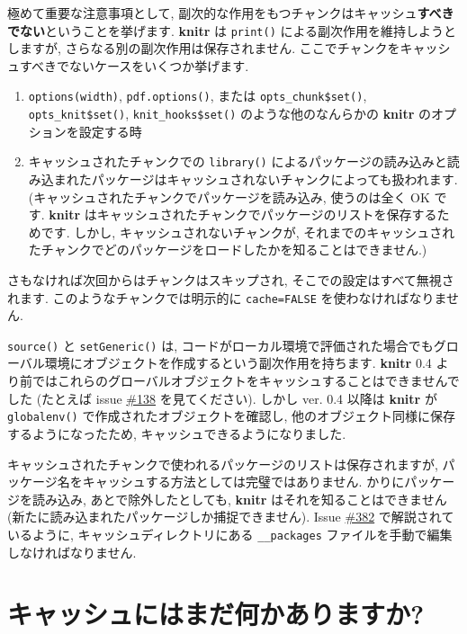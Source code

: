 \documentclass[
  xelatex,ja=standard,jafont=noto]{bxjsreport}
\providecommand{\tightlist}{%
  \setlength{\itemsep}{0pt}\setlength{\parskip}{0pt}}
\begin{document}
極めて重要な注意事項として,
副次的な作用をもつチャンクはキャッシュ\textbf{すべきでない}ということを挙げます.
\textbf{knitr} は \texttt{print()} による副次作用を維持しようとしますが,
さらなる別の副次作用は保存されません.
ここでチャンクをキャッシュすべきでないケースをいくつか挙げます.

\begin{enumerate}
\def\labelenumi{\arabic{enumi}.}
\tightlist
\item
  \texttt{options(\textquotesingle{}width\textquotesingle{})},
  \texttt{pdf.options()}, または \texttt{opts\_chunk\$set()},
  \texttt{opts\_knit\$set()}, \texttt{knit\_hooks\$set()}
  のような他のなんらかの \textbf{knitr} のオプションを設定する時
\item
  キャッシュされたチャンクでの \texttt{library()}
  によるパッケージの読み込みと読み込まれたパッケージはキャッシュされないチャンクによっても扱われます.
  (キャッシュされたチャンクでパッケージを読み込み, 使うのは全く OK です.
  \textbf{knitr}
  はキャッシュされたチャンクでパッケージのリストを保存するためです.
  しかし, キャッシュされないチャンクが,
  それまでのキャッシュされたチャンクでどのパッケージをロードしたかを知ることはできません.)
\end{enumerate}

さもなければ次回からはチャンクはスキップされ,
そこでの設定はすべて無視されます. このようなチャンクでは明示的に
\texttt{cache=FALSE} を使わなければなりません.

\texttt{source()} と \texttt{setGeneric()} は,
コードがローカル環境で評価された場合でもグローバル環境にオブジェクトを作成するという副次作用を持ちます.
\textbf{knitr} 0.4
より前ではこれらのグローバルオブジェクトをキャッシュすることはできませんでした
(たとえば issue \href{https://github.com/yihui/knitr/issues/138}{\#138}
を見てください). しかし ver. 0.4 以降は \textbf{knitr} が
\texttt{globalenv()} で作成されたオブジェクトを確認し,
他のオブジェクト同様に保存するようになったため,
キャッシュできるようになりました.

キャッシュされたチャンクで使われるパッケージのリストは保存されますが,
パッケージ名をキャッシュする方法としては完璧ではありません.
かりにパッケージを読み込み, あとで除外したとしても, \textbf{knitr}
はそれを知ることはできません
(新たに読み込まれたパッケージしか捕捉できません). Issue
\href{https://github.com/yihui/knitr/issues/382}{\#382}
で解説されているように, キャッシュディレクトリにある
\texttt{\_\_packages} ファイルを手動で編集しなければなりません.

\hypertarget{ux30adux30e3ux30c3ux30b7ux30e5ux306bux306fux307eux3060ux4f55ux304bux3042ux308aux307eux3059ux304b}{%
\section*{キャッシュにはまだ何かありますか?}\label{ux30adux30e3ux30c3ux30b7ux30e5ux306bux306fux307eux3060ux4f55ux304bux3042ux308aux307eux3059ux304b}}
\end{document}
